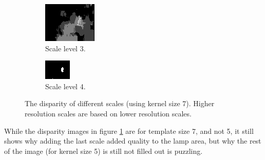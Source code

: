 \documentclass[12pt,a4paper,oneside,final]{article}
\begin{document}
{\begin{figure}[H]
\begin{subfigure}[b]{0.24\textwidth}
	\includegraphics[width=\textwidth]{disparity3.png}
	\caption{Scale level 3.}
\end{subfigure}
\begin{subfigure}[b]{0.24\textwidth}
	\includegraphics[width=\textwidth]{disparity4.png}
	\caption{Scale level 4.}
\end{subfigure}
\caption{The disparity of different scales (using kernel size 7). Higher resolution scales are based on lower resolution scales.}
\label{fig:lowlevel}
\end{figure}
While the disparity images in figure \ref{fig:lowlevel} are for template size 7, and not 5, it still shows why adding the last scale added quality to the lamp area, but why the rest of the image (for kernel size 5) is still not filled out is puzzling.}\\\\
\end{document}
